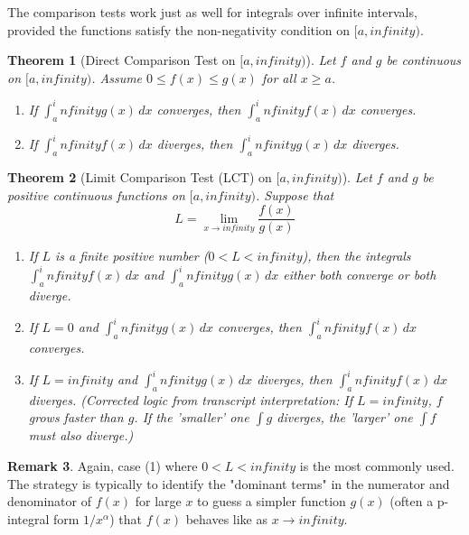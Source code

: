 \documentclass[11pt]{article}
\def\infty{infinity}%
\newtheorem{theorem}{Theorem}[section]
\theoremstyle{definition}
\newtheorem{remark}[theorem]{Remark}
\newcommand{\dx}{\, dx} %
\begin{document}
The comparison tests work just as well for integrals over infinite intervals, provided the functions satisfy the non-negativity condition on $[a, \infty)$.

\begin{theorem}[Direct Comparison Test on $[a, \infty)$]
    Let $f$ and $g$ be continuous on $[a, \infty)$. Assume $0 \le f(x) \le g(x)$ for all $x \ge a$.
    \begin{enumerate}
        \item If $\int_a^\infty g(x) \dx$ converges, then $\int_a^\infty f(x) \dx$ converges.
        \item If $\int_a^\infty f(x) \dx$ diverges, then $\int_a^\infty g(x) \dx$ diverges.
    \end{enumerate}
\end{theorem}

\begin{theorem}[Limit Comparison Test (LCT) on $[a, \infty)$]
    Let $f$ and $g$ be positive continuous functions on $[a, \infty)$. Suppose that
    \[
    L = \lim_{x \to \infty} \frac{f(x)}{g(x)}
    \]
    \begin{enumerate}
        \item If $L$ is a finite positive number ($0 < L < \infty$), then the integrals $\int_a^\infty f(x) \dx$ and $\int_a^\infty g(x) \dx$ either both converge or both diverge.
        \item If $L = 0$ and $\int_a^\infty g(x) \dx$ converges, then $\int_a^\infty f(x) \dx$ converges.
        \item If $L = \infty$ and $\int_a^\infty g(x) \dx$ diverges, then $\int_a^\infty f(x) \dx$ diverges. (Corrected logic from transcript interpretation: If $L=\infty$, $f$ grows faster than $g$. If the 'smaller' one $\int g$ diverges, the 'larger' one $\int f$ must also diverge.)
    \end{enumerate}
\end{theorem}

\begin{remark}
    Again, case (1) where $0 < L < \infty$ is the most commonly used. The strategy is typically to identify the "dominant terms" in the numerator and denominator of $f(x)$ for large $x$ to guess a simpler function $g(x)$ (often a p-integral form $1/x^\alpha$) that $f(x)$ behaves like as $x \to \infty$.
\end{remark}
\end{document}
